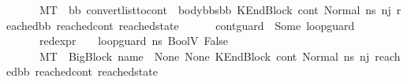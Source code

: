 \begin{isabellebody}
\ \ \ \ \ \ M{\isacharcomma}{\kern0pt}{\isasymLambda}{\isacharcomma}{\kern0pt}{\isasymGamma}{\isacharcomma}{\kern0pt}{\isasymOmega}{\isacharcomma}{\kern0pt}T\ {\isasymturnstile}\ {\isacharparenleft}{\kern0pt}bb{}{\isacharcomma}{\kern0pt}\ convert{\isacharunderscore}{\kern0pt}list{\isacharunderscore}{\kern0pt}to{\isacharunderscore}{\kern0pt}cont\ {\isacharparenleft}{\kern0pt}{\isacharparenleft}{\kern0pt}\ body{\isacharunderscore}{\kern0pt}bbs{\isacharparenright}{\kern0pt}{\isacharat}{\kern0pt}{\isacharbrackleft}{\kern0pt}bb{\isacharbrackright}{\kern0pt}{\isacharparenright}{\kern0pt}\ {\isacharparenleft}{\kern0pt}KEndBlock\ cont{}{\isacharparenright}{\kern0pt}{\isacharcomma}{\kern0pt}\ {\isacharparenleft}{\kern0pt}Normal\ ns{}{\isacharprime}{\kern0pt}{\isacharprime}{\kern0pt}{\isacharparenright}{\kern0pt}{\isacharparenright}{\kern0pt}\ {\isacharminus}{\kern0pt}n{\isasymlongrightarrow}{\isacharcircum}{\kern0pt}j{\isacharprime}{\kern0pt}\ {\isacharparenleft}{\kern0pt}reached{\isacharunderscore}{\kern0pt}bb{\isacharcomma}{\kern0pt}\ reached{\isacharunderscore}{\kern0pt}cont{\isacharcomma}{\kern0pt}\ reached{\isacharunderscore}{\kern0pt}state{\isacharparenright}{\kern0pt}{\isacharparenright}{\kern0pt}\ {\isasymor}\ \isanewline
\ \ \ \ {\isacharparenleft}{\kern0pt}{\isacharparenleft}{\kern0pt}cont{\isacharunderscore}{\kern0pt}guard\ {\isacharequal}{\kern0pt}\ Some\ loop{\isacharunderscore}{\kern0pt}guard{\isacharparenright}{\kern0pt}\ {\isasymand}\ \isanewline
\ \ \ \ \ \ {\isacharparenleft}{\kern0pt}red{\isacharunderscore}{\kern0pt}expr\ {\isasymLambda}\ {\isasymGamma}\ {\isasymOmega}\ loop{\isacharunderscore}{\kern0pt}guard\ ns{}{\isacharprime}{\kern0pt}{\isacharprime}{\kern0pt}\ {\isacharparenleft}{\kern0pt}BoolV\ False{\isacharparenright}{\kern0pt}{\isacharparenright}{\kern0pt}\ {\isasymand}\ \isanewline
\ \ \ \ \ \ M{\isacharcomma}{\kern0pt}{\isasymLambda}{\isacharcomma}{\kern0pt}{\isasymGamma}{\isacharcomma}{\kern0pt}{\isasymOmega}{\isacharcomma}{\kern0pt}T\ {\isasymturnstile}\ {\isacharparenleft}{\kern0pt}{\isacharparenleft}{\kern0pt}BigBlock\ name\ {\isacharbrackleft}{\kern0pt}{\isacharbrackright}{\kern0pt}\ None\ None{\isacharparenright}{\kern0pt}{\isacharcomma}{\kern0pt}\ KEndBlock\ cont{}{\isacharcomma}{\kern0pt}\ {\isacharparenleft}{\kern0pt}Normal\ ns{}{\isacharprime}{\kern0pt}{\isacharprime}{\kern0pt}{\isacharparenright}{\kern0pt}{\isacharparenright}{\kern0pt}\ {\isacharminus}{\kern0pt}n{\isasymlongrightarrow}{\isacharcircum}{\kern0pt}j{\isacharprime}{\kern0pt}\ {\isacharparenleft}{\kern0pt}reached{\isacharunderscore}{\kern0pt}bb{\isacharcomma}{\kern0pt}\ reached{\isacharunderscore}{\kern0pt}cont{\isacharcomma}{\kern0pt}\ reached{\isacharunderscore}{\kern0pt}state{\isacharparenright}{\kern0pt}{\isacharparenright}{\kern0pt}\ {\isasymor}\isanewline

\end{isabellebody}
